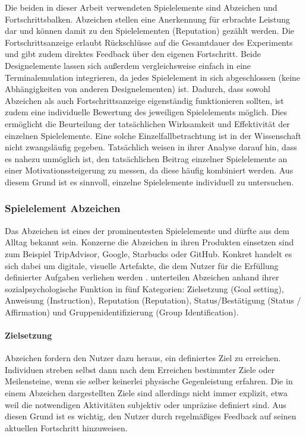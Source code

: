 Die beiden in dieser Arbeit verwendeten Spielelemente sind Abzeichen und Fortschrittsbalken. Abzeichen stellen eine Anerkennung für erbrachte Leistung dar und können damit zu den  Spielelementen (Reputation) gezählt werden. Die Fortschrittsanzeige erlaubt Rückschlüsse auf die Gesamtdauer des Experiments und gibt zudem direktes Feedback über den eigenen Fortschritt. Beide Designelemente lassen sich außerdem vergleichsweise einfach in eine Terminalemulation integrieren, da jedes Spielelement in sich abgeschlossen (keine Abhängigkeiten von anderen Designelementen) ist. Dadurch, dass sowohl Abzeichen als auch Fortschrittsanzeige eigenständig funktionieren sollten, ist zudem eine individuelle Bewertung des jeweiligen Spielelements möglich. Dies ermöglicht die Beurteilung der tatsächlichen Wirksamkeit und Effektivität der einzelnen Spielelemente. Eine solche Einzelfallbetrachtung ist in der Wissenschaft nicht zwangsläufig gegeben. Tatsächlich weisen  in ihrer Analyse darauf hin, dass es nahezu unmöglich ist, den tatsächlichen Beitrag einzelner Spielelemente an einer Motivationssteigerung zu messen, da diese häufig kombiniert werden. Aus diesem Grund ist es sinnvoll, einzelne Spielelemente individuell zu untersuchen.


\subsubsection{Spielelement Abzeichen}\label{badge}
Das Abzeichen ist eines der prominentesten Spielelemente und dürfte aus dem Alltag bekannt sein. Konzerne die Abzeichen in ihren Produkten einsetzen sind zum Beispiel TripAdvisor, Google, Starbucks oder GitHub. Konkret handelt es sich dabei um digitale, visuelle Artefakte, die dem Nutzer für die Erfüllung definierter Aufgaben verliehen werden \cite{antin_badges_2011}.  unterteilen Abzeichen anhand ihrer sozialpsychologische Funktion in fünf Kategorien: Zielsetzung (Goal setting), Anweisung (Instruction), Reputation (Reputation),
Status/Bestätigung (Status / Affirmation) und Gruppenidentifizierung (Group Identification). 


\paragraph{Zielsetzung}
Abzeichen fordern den Nutzer dazu heraus, ein definiertes Ziel zu erreichen. Individuen streben selbst dann nach dem Erreichen bestimmter Ziele oder Meilensteine, wenn sie selber keinerlei physische Gegenleistung erfahren. Die in einem Abzeichen dargestellten Ziele sind allerdings nicht immer explizit, etwa weil die notwendigen Aktivitäten subjektiv oder unpräzise definiert sind. Aus diesen Grund ist es wichtig, den Nutzer durch regelmäßiges Feedback auf seinen aktuellen Fortschritt hinzuweisen. 

